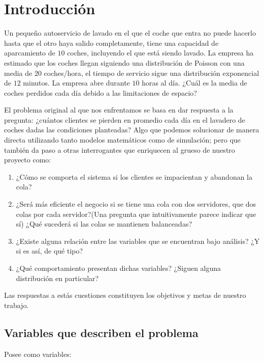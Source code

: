\documentclass[14pt]{extarticle}
\begin{document}
\section{Introducción}

\begin{tcolorbox}[colback=blue!5!white,colframe=blue!75!black, title = Lavadero de Coches]
    
    Un pequeño autoservicio de lavado en el que el coche que entra no puede
    hacerlo hasta que el otro haya salido completamente, tiene una capacidad de
    aparcamiento de $10$ coches, incluyendo el que está siendo lavado. La empresa ha
    estimado que los coches llegan siguiendo una distribución de Poisson con una
    media de $20$ coches/hora, el tiempo de servicio sigue una distribución exponencial
    de $12$ minutos. La empresa abre durante $10$ horas al día. ¿Cuál es la media de
    coches perdidos cada día debido a las limitaciones de espacio?

\end{tcolorbox}

El problema original al que nos enfrentamos se basa en dar respuesta a la pregunta: ¿cuántos clientes se pierden en promedio cada día en el lavadero de coches dadas las condiciones planteadas? Algo que podemos solucionar de manera directa utilizando tanto modelos matemáticos como de simulación; pero que también da paso a otras interrogantes que enriquecen al grueso de nuestro proyecto como:

\begin{enumerate}
    \item ¿Cómo se comporta el sistema si los clientes se impacientan y abandonan la cola?
    \item ¿Será más eficiente el negocio si se tiene una cola con dos servidores, que dos colas por cada servidor?(Una pregunta que intuitivamente parece indicar que sí) ¿Qué sucederá si las colas se mantienen balanceadas?
    \item ¿Existe alguna relación entre las variables que se encuentran bajo análisis? ¿Y si es así, de qué tipo?
    \item ¿Qué comportamiento presentan dichas variables? ¿Siguen alguna distribución en particular?
\end{enumerate}

Las respuestas a estás cuestiones constituyen los objetivos y metas de nuestro trabajo.


\subsection{Variables que describen el problema}
Posee como variables:
\end{document}
